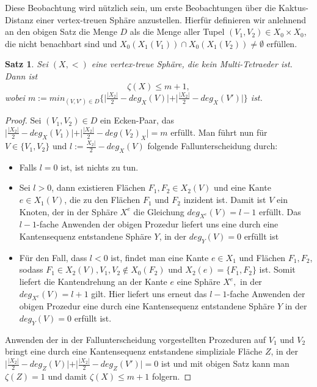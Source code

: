 \documentclass[12pt,titlepage,twoside,cleardoublepage]{article}
\theoremstyle{nummermitklammern}
\newtheorem{satz}[temp]{Satz}
\newtheorem{satz}[zahl]{Satz}
\numberwithin{equation}{section}
\begin{document}
Diese Beobachtung wird nützlich sein, um erste Beobachtungen über die Kaktus-Distanz einer vertex-treuen Sphäre anzustellen. Hierfür definieren wir anlehnend an den obigen Satz die Menge $D$ als die Menge aller Tupel $(V_1,V_2)\in X_0 \times X_0$, die nicht benachbart sind und $ X_0(X_1(V_1))\cap X_0(X_1(V_2))\neq \emptyset$ erfüllen.
\begin{satz}
Sei $(X,<)$ eine vertex-treue Sphäre, die kein Multi-Tetraeder ist. Dann ist 
\[
\zeta(X)\leq m+1,
\] wobei $m:=min_{(V,V')\in D}\{\vert\frac{\vert X_2 \vert}{2}-deg_X(V)\vert +\vert \frac{\vert X_2 \vert}{2}-deg_X(V')\vert\}$
 ist.
\end{satz}
\begin{proof}
Sei $(V_1,V_2)\in D$ ein Ecken-Paar, das 
$\vert\frac{\vert X_2 \vert}{2}-deg_X(V_1)\vert +\vert \frac{\vert X_2 \vert}{2}-deg(V_2)_X\vert=m$ erfüllt.
Man führt nun für $V \in \{V_1,V_2\}$ und $l:=\frac{X_2 \vert}{2}-deg_X(V)$ folgende Fallunterscheidung durch:
\begin{itemize}
\item Falls $l=0$ ist, ist nichts zu tun.
\item Sei $l>0$, dann existieren Flächen $F_1,F_2 \in X_2(V)$ und eine Kante $e\in X_1(V)$, die zu den Flächen $F_1$ und $F_2$ inzident ist. Damit ist $V$ ein Knoten, der in der Sphäre $X^e$ die Gleichung $deg_{X^e}(V)=l-1$ erfüllt. Das $l-1$-fache Anwenden der obigen Prozedur liefert uns eine durch eine Kantensequenz entstandene Sphäre $Y$, in der  $deg_Y(V)=0$ erfüllt ist 
 \item Für den Fall, dass $l<0$ ist, findet man eine Kante $e\in X_1$ und Flächen $F_1,F_2$, sodass $F_1\in X_2(V),V_1,V_2 \notin X_0(F_2)$ und $X_2(e)=\{F_1,F_2\}$ ist. Somit liefert die Kantendrehung an der Kante $e$ eine Sphäre $X^e,$ in der $deg_{X^e}(V)=l+1$ gilt. Hier liefert uns erneut das $l-1$-fache Anwenden der obigen Prozedur eine durch eine Kantensequenz entstandene Sphäre $Y$ in der  $deg_Y(V)=0$ erfüllt ist.
\end{itemize}  
 Anwenden der in der Fallunterscheidung vorgestellten Prozeduren auf $V_1$ und $V_2$ bringt eine durch eine Kantensequenz entstandene simpliziale Fläche $Z$, in der $\vert\frac{\vert X_2 \vert}{2}-deg_Z(V)\vert +\vert \frac{\vert X_2 \vert}{2}-deg_Z(V')\vert=0$ ist und mit obigen Satz kann man $\zeta(Z)=1$ und damit $\zeta(X)\leq m+1$ folgern. 
\end{proof}
\end{document}
